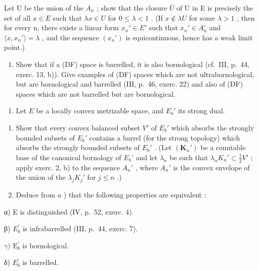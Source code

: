 Let U be the union of the \(A_{n}\) ; show that the closure \(\overline{U}\) of U in E is precisely the set of all \(x \in E\) such that \(\lambda x \in U\) for \(0 \leqslant \lambda < 1\) . (If \(x \notin \lambda U\) for some \(\lambda > 1\) , then for every n, there exists a linear form \(x_{n}' \in E'\) such that \(x_{n}' \in A_{n}^{\circ}\) and \(\langle x, x_{n}' \rangle = \lambda\) , and the sequence \((x_{n}')\) is equicontinuous, hence has a weak limit point.)

\begin{enumerate}
\def\labelenumi{\alph{enumi})}
\setcounter{enumi}{2}
\tightlist
\item
  Show that if a (DF) space is barrelled, it is also bornological (cf.~III, p.~44, exerc. 13, b)). Give examples of (DF) spaces which are not ultrabornological, but are bornological and barrelled (III, p.~46, exerc. 22) and also of (DF) spaces which are not barrelled but are bornological.
\end{enumerate}

\begin{enumerate}
\def\labelenumi{\arabic{enumi})}
\setcounter{enumi}{2}
\tightlist
\item
  Let \(E\) be a locally convex metrizable space, and \(E_b'\) its strong dual.
\end{enumerate}

\begin{enumerate}
\def\labelenumi{\alph{enumi})}
\item
  Show that every convex balanced subset \(V'\) of \(E_{b}'\) which absorbs the strongly bounded subsets of \(E_{b}'\) contains a barrel (for the strong topology) which absorbs the strongly bounded subsets of \(E_{b}'\) . (Let \((\mathbf{K}_{n}')\) be a countable base of the canonical bornology of \(E_{b}'\) and let \(\lambda_{n}\) be such that \(\lambda_{n}K_{n}' \subset \frac{1}{2}V'\) ; apply exerc. 2, b) to the sequence \(A_{n}'\) , where \(A_{n}'\) is the convex envelope of the union of the \(\lambda_{j}K_{j}'\) for \(j \leqslant n\) .)
\item
  Deduce from \(a\) ) that the following properties are equivalent :
\end{enumerate}

α) E is distinguished (IV, p.~52, exerc. 4).

β) \(E_{b}^{\prime}\) is infrabarrelled (III, p.~44, exerc. 7).

\(\gamma)\) \(\mathrm{E}_b^{\prime}\) is bornological.

δ) \(E_{b}^{\prime}\) is barrelled.

